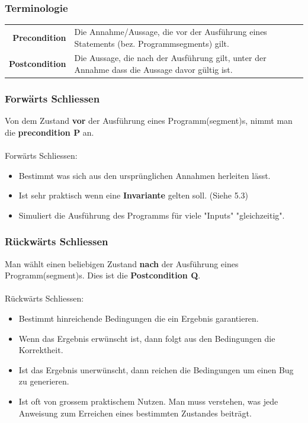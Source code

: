 \documentclass[12pt,a4paper]{article}
\begin{document}
\subsubsection{Terminologie}
\begin{tabularx}{\linewidth}{r X}
\textbf{Precondition} & Die Annahme/Aussage, die vor der Ausführung eines Statements (bez. Programmsegments) gilt.\\
\textbf{Postcondition} & Die Aussage, die nach der Ausführung gilt, unter der Annahme dass die Aussage davor gültig ist.
\end{tabularx}
\subsubsection{Forwärts Schliessen}
Von dem Zustand \textbf{vor} der Ausführung eines Programm(segment)s, nimmt man die \textbf{precondition P} an.\\\\
Forwärts Schliessen:
\begin{itemize}
\item Bestimmt was sich aus den ursprünglichen Annahmen herleiten lässt.
\item Ist sehr praktisch wenn eine \textbf{Invariante} gelten soll. (Siehe 5.3) %
\item Simuliert die Ausführung des Programms für viele "Inputs" "gleichzeitig".
\end{itemize}
\subsubsection{Rückwärts Schliessen}
Man wählt einen beliebigen Zustand \textbf{nach} der Ausführung eines Programm(segment)s. Dies ist die \textbf{Postcondition Q}.\\\\
Rückwärts Schliessen:
\begin{itemize}
\item Bestimmt hinreichende Bedingungen die ein Ergebnis garantieren.
\item Wenn das Ergebnis erwünscht ist, dann folgt aus den Bedingungen die Korrektheit.
\item Ist das Ergebnis unerwünscht, dann reichen die Bedingungen um einen Bug zu generieren.
\item Ist oft von grossem praktischem Nutzen. Man muss verstehen, was jede Anweisung zum Erreichen eines bestimmten Zustandes beiträgt.
\end{itemize}
\end{document}
